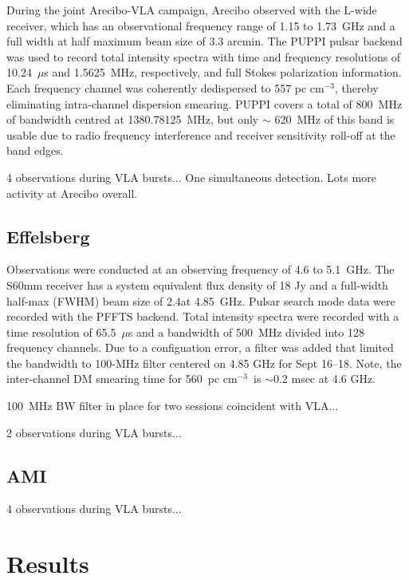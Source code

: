 \documentclass{emulateapj}
\begin{document}
During the joint Arecibo-VLA campaign, Arecibo observed with the L-wide receiver, which has an observational frequency range of 1.15 to 1.73~GHz and a full width at half maximum beam size of 3.3 arcmin. The PUPPI pulsar backend was used to record total intensity spectra with time and frequency resolutions of 10.24~$\mu$s and 1.5625~MHz, respectively, and full Stokes polarization information. Each frequency channel was coherently dedispersed to 557 pc cm$^{-3}$, thereby eliminating intra-channel dispersion smearing. PUPPI covers a total of 800~MHz of bandwidth centred at 1380.78125~MHz, but only $\sim$ 620~MHz of this band is usable due to radio frequency interference and receiver sensitivity roll-off at the band edges.

4 observations during VLA bursts... One simultaneous detection. Lots more activity at Arecibo overall.

\subsection{Effelsberg}

Observations were conducted at an observing frequency of 4.6 to 5.1~GHz. The S60mm receiver has a system equivalent flux density of 18 Jy and a full-width half-max (FWHM) beam size of 2.4\arcmin at 4.85~GHz. Pulsar search mode data were recorded with the PFFTS backend. Total intensity spectra were recorded with a time resolution of 65.5~$\mu$s and a bandwidth of 500~MHz divided into 128 frequency channels. Due to a configuation error, a filter was added that limited the bandwidth to 100-MHz filter centered on 4.85 GHz for Sept 16--18. Note, the inter-channel DM smearing time for 560~pc cm$^{-3}$\ is $\sim$0.2 msec at 4.6 GHz.



100~MHz BW filter in place for two sessions coincident with VLA...

2 observations during VLA bursts...

\subsection{AMI}

4 observations during VLA bursts...

\section{Results}
\end{document}
